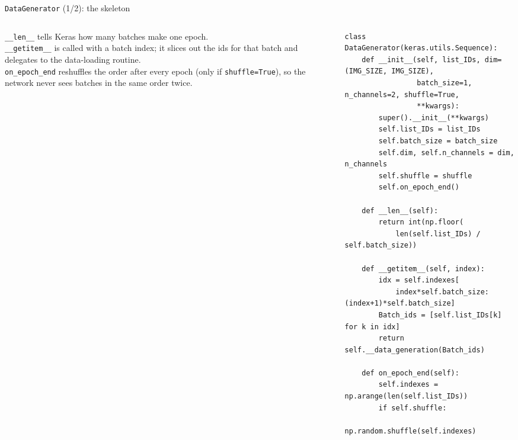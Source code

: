 \documentclass[10pt,aspectratio=169]{beamer}
\begin{document}
\begin{frame}[fragile]{\texttt{DataGenerator} (1/2): the skeleton}
\begin{columns}[T,onlytextwidth]
\begin{column}{0.42\textwidth}
\small
\texttt{\_\_len\_\_} tells Keras how many batches make one epoch.\\[0.4em]
\texttt{\_\_getitem\_\_} is called with a batch index; it slices out the ids for that batch and
delegates to the data-loading routine.\\[0.4em]
\texttt{on\_epoch\_end} reshuffles the order after every epoch (only if \texttt{shuffle=True}), so
the network never sees batches in the same order twice.
\end{column}
\begin{column}{0.56\textwidth}
\begin{lstlisting}[firstnumber=last]
class DataGenerator(keras.utils.Sequence):
    def __init__(self, list_IDs, dim=(IMG_SIZE, IMG_SIZE),
                 batch_size=1, n_channels=2, shuffle=True,
                 **kwargs):
        super().__init__(**kwargs)
        self.list_IDs = list_IDs
        self.batch_size = batch_size
        self.dim, self.n_channels = dim, n_channels
        self.shuffle = shuffle
        self.on_epoch_end()

    def __len__(self):
        return int(np.floor(
            len(self.list_IDs) / self.batch_size))

    def __getitem__(self, index):
        idx = self.indexes[
            index*self.batch_size:(index+1)*self.batch_size]
        Batch_ids = [self.list_IDs[k] for k in idx]
        return self.__data_generation(Batch_ids)

    def on_epoch_end(self):
        self.indexes = np.arange(len(self.list_IDs))
        if self.shuffle:
            np.random.shuffle(self.indexes)
\end{lstlisting}
\end{column}
\end{columns}
\end{frame}
\end{document}
